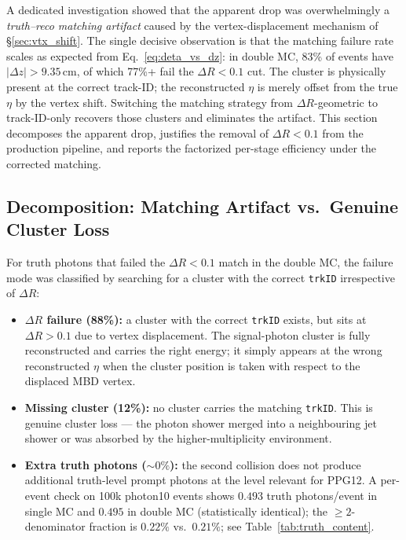 \documentclass[11pt,a4paper]{article}
\newcommand{\DR}{\ensuremath{\Delta R}\xspace}
\begin{document}
A dedicated investigation showed that the apparent drop was
overwhelmingly a \emph{truth--reco matching artifact} caused by the
vertex-displacement mechanism of \S\ref{sec:vtx_shift}. The single
decisive observation is that the matching failure rate scales as
expected from Eq.~\eqref{eq:deta_vs_dz}: in double MC, 83\% of events
have $|\Delta z|>9.35$\,cm, of which 77\%+ fail the $\DR<0.1$ cut.
The cluster is physically present at the correct track-ID; the
reconstructed $\eta$ is merely offset from the true $\eta$ by the
vertex shift. Switching the matching strategy from $\DR$-geometric to
track-ID-only recovers those clusters and eliminates the artifact.
This section decomposes the apparent drop, justifies the removal of
$\DR<0.1$ from the production pipeline, and reports the factorized
per-stage efficiency under the corrected matching.

\subsection{Decomposition: Matching Artifact vs.\ Genuine Cluster Loss}
\label{subsec:decomposition}

For truth photons that failed the $\DR<0.1$ match in the double MC,
the failure mode was classified by searching for a cluster with the
correct \texttt{trkID} irrespective of $\DR$:
\begin{itemize}
\item \textbf{\DR failure (88\%):} a cluster with the correct
  \texttt{trkID} exists, but sits at $\DR>0.1$ due to vertex
  displacement. The signal-photon cluster is fully reconstructed and
  carries the right energy; it simply appears at the wrong
  reconstructed $\eta$ when the cluster position is taken with respect
  to the displaced MBD vertex.
\item \textbf{Missing cluster (12\%):} no cluster carries the matching
  \texttt{trkID}. This is genuine cluster loss --- the photon shower
  merged into a neighbouring jet shower or was absorbed by the
  higher-multiplicity environment.
\item \textbf{Extra truth photons ($\sim 0\%$):} the second collision
  does not produce additional truth-level prompt photons at the level
  relevant for PPG12. A per-event check on 100k photon10 events shows
  $0.493$ truth photons/event in single MC and $0.495$ in double MC
  (statistically identical); the $\geq 2$-denominator fraction is
  $0.22\%$ vs.\ $0.21\%$; see Table~\ref{tab:truth_content}.
\end{itemize}
\end{document}

